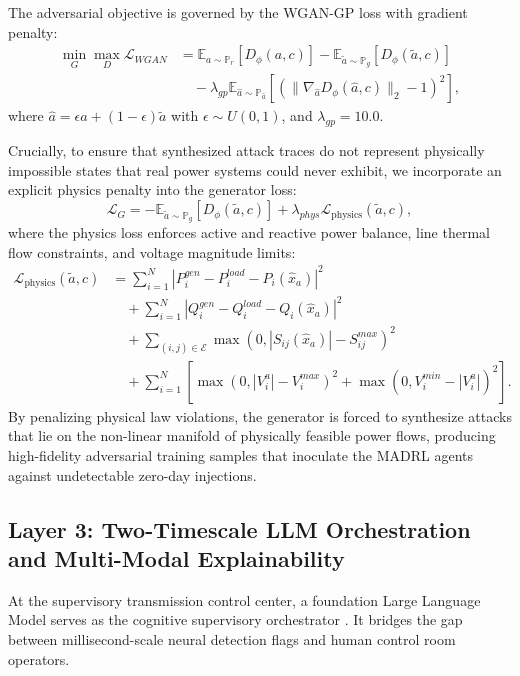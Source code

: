 \documentclass[journal,compsoc]{IEEEtran}
\begin{document}
The adversarial objective is governed by the WGAN-GP loss with gradient penalty:
\begin{align}
    \min_G \max_D \mathcal{L}_{WGAN} &= \mathbb{E}_{a \sim \mathbb{P}_r} [D_\phi(a, c)] - \mathbb{E}_{\tilde{a} \sim \mathbb{P}_g} [D_\phi(\tilde{a}, c)] \nonumber \\
    &\quad - \lambda_{gp} \mathbb{E}_{\hat{a} \sim \mathbb{P}_{\hat{a}}} \left[ (\|\nabla_{\hat{a}} D_\phi(\hat{a}, c)\|_2 - 1)^2 \right],
\end{align}
where $\hat{a} = \epsilon a + (1 - \epsilon) \tilde{a}$ with $\epsilon \sim U(0, 1)$, and $\lambda_{gp} = 10.0$.

Crucially, to ensure that synthesized attack traces do not represent physically impossible states that real power systems could never exhibit, we incorporate an explicit physics penalty into the generator loss:
\begin{equation}
    \mathcal{L}_G = -\mathbb{E}_{\tilde{a} \sim \mathbb{P}_g} [D_\phi(\tilde{a}, c)] + \lambda_{phys} \mathcal{L}_{\text{physics}}(\tilde{a}, c),
\end{equation}
where the physics loss enforces active and reactive power balance, line thermal flow constraints, and voltage magnitude limits:
\begin{align}
    \mathcal{L}_{\text{physics}}(\tilde{a}, c) &= \sum_{i=1}^N \left| P_i^{gen} - P_i^{load} - P_i(\hat{x}_a) \right|^2 \nonumber \\
    &\quad + \sum_{i=1}^N \left| Q_i^{gen} - Q_i^{load} - Q_i(\hat{x}_a) \right|^2 \nonumber \\
    &\quad + \sum_{(i,j) \in \mathcal{E}} \max\left( 0, |S_{ij}(\hat{x}_a)| - S_{ij}^{max} \right)^2 \nonumber \\
    &\quad + \sum_{i=1}^N \left[ \max(0, |V_i^a| - V_i^{max})^2 + \max(0, V_i^{min} - |V_i^a|)^2 \right].
\end{align}
By penalizing physical law violations, the generator is forced to synthesize attacks that lie on the non-linear manifold of physically feasible power flows, producing high-fidelity adversarial training samples that inoculate the MADRL agents against undetectable zero-day injections.

\subsection{Layer 3: Two-Timescale LLM Orchestration and Multi-Modal Explainability}
At the supervisory transmission control center, a foundation Large Language Model serves as the cognitive supervisory orchestrator \cite{ref81, ref82, ref83}. It bridges the gap between millisecond-scale neural detection flags and human control room operators.
\end{document}
